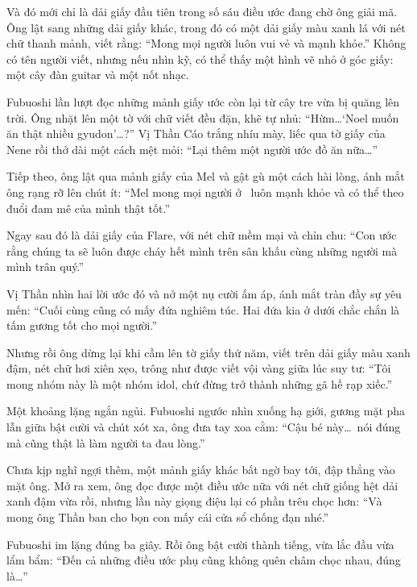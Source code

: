 \documentclass[../main.tex]{subfiles}
\begin{document}
Và đó mới chỉ là dải giấy đầu tiên trong số sáu điều ước đang chờ ông giải mã. Ông lật sang những dải giấy khác, trong đó có một dải giấy màu xanh lá với nét chữ thanh mảnh, viết rằng: ``Mong mọi người luôn vui vẻ và mạnh khỏe.'' Không có tên người viết, nhưng nếu nhìn kỹ, có thể thấy một hình vẽ nhỏ ở góc giấy: một cây đàn guitar và một nốt nhạc.

\omk

Fubuoshi lần lượt đọc những mảnh giấy ước còn lại từ cây tre vừa bị quăng lên trời. Ông nhặt lên một tờ với chữ viết đều đặn, khẽ tự nhủ: ``Hừm\dots `Noel muốn ăn thật nhiều gyudon'\dots?'' Vị Thần Cáo trắng nhíu mày, liếc qua tờ giấy của Nene rồi thở dài một cách mệt mỏi: ``Lại thêm một người ước đồ ăn nữa\dots''

Tiếp theo, ông lật qua mảnh giấy của Mel và gật gù một cách hài lòng, ánh mắt ông rạng rỡ lên chút ít: ``Mel mong mọi người ở \hll\ luôn mạnh khỏe và có thể theo đuổi đam mê của mình thật tốt.''

Ngay sau đó là dải giấy của Flare, với nét chữ mềm mại và chỉn chu: ``Con ước rằng chúng ta sẽ luôn được cháy hết mình trên sân khấu cùng những người mà mình trân quý.''

Vị Thần nhìn hai lời ước đó và nở một nụ cười ấm áp, ánh mắt tràn đầy sự yêu mến: ``Cuối cùng cũng có mấy đứa nghiêm túc. Hai đứa kia ở dưới chắc chắn là tấm gương tốt cho mọi người.''

Nhưng rồi ông dừng lại khi cầm lên tờ giấy thứ năm, viết trên dải giấy màu xanh đậm, nét chữ hơi xiên xẹo, trông như được viết vội vàng giữa lúc suy tư: ``Tôi mong nhóm này là một nhóm idol, chứ đừng trở thành những gã hề rạp xiếc.''

Một khoảng lặng ngắn ngủi. Fubuoshi ngước nhìn xuống hạ giới, gương mặt pha lẫn giữa bật cười và chút xót xa, ông đưa tay xoa cằm: ``Cậu bé này\dots\ nói đúng mà cũng thật là làm người ta đau lòng.''

Chưa kịp nghĩ ngợi thêm, một mảnh giấy khác bất ngờ bay tới, đập thẳng vào mặt ông. Mở ra xem, ông đọc được một điều ước nữa với nét chữ giống hệt dải xanh đậm vừa rồi, nhưng lần này giọng điệu lại có phần trêu chọc hơn: ``Và mong ông Thần ban cho bọn con mấy cái cửa sổ chống đạn nhé.''

Fubuoshi im lặng đúng ba giây. Rồi ông bật cười thành tiếng, vừa lắc đầu vừa lẩm bẩm: ``Đến cả những điều ước phụ cũng không quên châm chọc nhau, đúng là\dots''
\end{document}
